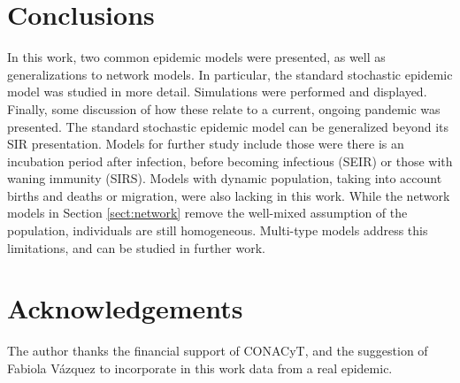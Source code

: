 \documentclass[aap]{imsart}
\theoremstyle{remark}
\begin{document}
\section{Conclusions}\label{sect:conclusions}
In this work, two common epidemic models were presented, as well as generalizations to network models. In particular, the standard stochastic epidemic model was studied in more detail. Simulations were performed and displayed. Finally, some discussion of how these relate to a current, ongoing pandemic was presented. The standard stochastic epidemic model can be generalized beyond its SIR presentation. Models for further study include those were there is an incubation period after infection, before becoming infectious (SEIR) or those with waning immunity (SIRS). Models with dynamic population, taking into account births and deaths or migration, were also lacking in this work. While the network models in Section \ref{sect:network} remove the well-mixed assumption of the population, individuals are still homogeneous. Multi-type models \citep{Andersson_Britton_2000} address this limitations, and can be studied in further work. 
\section*{Acknowledgements}
The author thanks the financial support of CONACyT, and the suggestion of Fabiola V\'azquez to incorporate in this work data from a real epidemic.


\end{document}
